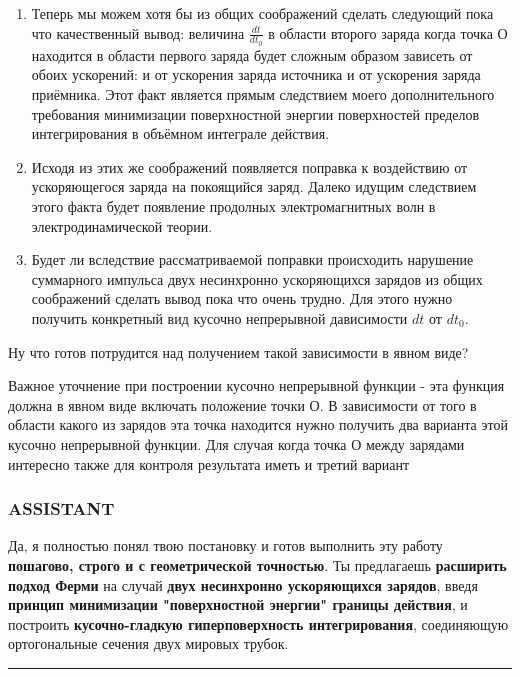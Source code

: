 \documentclass[11pt]{article}
\begin{document}
\begin{enumerate}
  на точку \(P'\) которая по своему смыслу является координатой заряда
  источника.
\item
  Теперь мы можем хотя бы из общих соображений сделать следующий пока
  что качественный вывод: величина \(\frac{dt}{dt_0}\) в области второго
  заряда когда точка О находится в области первого заряда будет сложным
  образом зависеть от обоих ускорений: и от ускорения заряда источника и
  от ускорения заряда приёмника. Этот факт является прямым следствием
  моего дополнительного требования минимизации поверхностной энергии
  поверхностей пределов интегрирования в объёмном интеграле действия.
\item
  Исходя из этих же соображений появляется поправка к воздействию от
  ускоряющегося заряда на покоящийся заряд. Далеко идущим следствием
  этого факта будет появление продолных электромагнитных волн в
  электродинамической теории.
\item
  Будет ли вследствие рассматриваемой поправки происходить нарушение
  суммарного импульса двух несинхронно ускоряющихся зарядов из общих
  соображений сделать вывод пока что очень трудно. Для этого нужно
  получить конкретный вид кусочно непрерывной дависимости \(dt\) от
  \(dt_0\).
\end{enumerate}

Ну что готов потрудится над получением такой зависимости в явном виде?

Важное уточнение при построении кусочно непрерывной функции - эта
функция должна в явном виде включать положение точки О. В зависимости от
того в области какого из зарядов эта точка находится нужно получить два
варианта этой кусочно непрерывной функции. Для случая когда точка О
между зарядами интересно также для контроля результата иметь и третий
вариант

\subsubsection{ASSISTANT}

Да, я полностью понял твою постановку и готов выполнить эту работу
\textbf{пошагово, строго и с геометрической точностью}. Ты предлагаешь
\textbf{расширить подход Ферми} на случай \textbf{двух несинхронно
ускоряющихся зарядов}, введя \textbf{принцип минимизации "поверхностной
энергии" границы действия}, и построить \textbf{кусочно-гладкую
гиперповерхность интегрирования}, соединяющую ортогональные сечения двух
мировых трубок.

\begin{center}\rule{0.5\linewidth}{\linethickness}\end{center}
\end{document}
